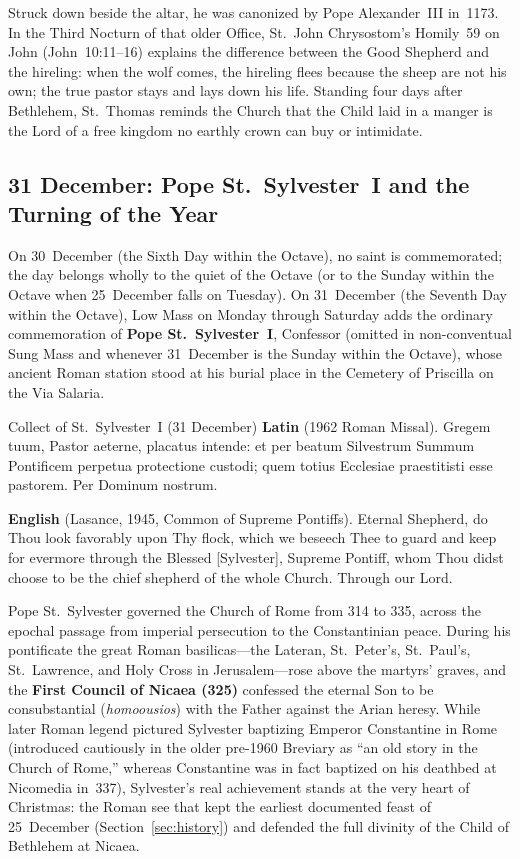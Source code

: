 Struck down beside the altar, he was canonized by Pope Alexander~III in~1173.
In the Third Nocturn of that older Office, St.~John Chrysostom's Homily~59 on
John (John~10:11--16) explains the difference between the Good Shepherd and the
hireling: when the wolf comes, the hireling flees because the sheep are not his
own; the true pastor stays and lays down his life. Standing four days after
Bethlehem, St.~Thomas reminds the Church that the Child laid in a manger is the
Lord of a free kingdom no earthly crown can buy or intimidate.

\subsection{31 December: Pope St.~Sylvester~I and the Turning of the Year}

On 30~December (the Sixth Day within the Octave), no saint is commemorated;
the day belongs wholly to the quiet of the Octave (or to the Sunday within the
Octave when 25~December falls on Tuesday). On 31~December (the Seventh Day
within the Octave), Low Mass on Monday through Saturday adds the ordinary
commemoration of \textbf{Pope St.~Sylvester~I}, Confessor (omitted in
non-conventual Sung Mass and whenever 31~December is the Sunday within the
Octave), whose ancient Roman station stood at his burial place in the Cemetery
of Priscilla on the Via Salaria.

\begin{massbox}{Collect of St.~Sylvester~I (31 December)}
\textbf{Latin} (1962 Roman Missal). Gregem tuum, Pastor aeterne, placatus
intende: et per beatum Silvestrum Summum Pontificem perpetua protectione
custodi; quem totius Ecclesiae praestitisti esse pastorem. Per Dominum nostrum.

\textbf{English} (Lasance, 1945, Common of Supreme Pontiffs). Eternal Shepherd,
do Thou look favorably upon Thy flock, which we beseech Thee to guard and keep
for evermore through the Blessed [Sylvester], Supreme Pontiff, whom Thou didst
choose to be the chief shepherd of the whole Church. Through our Lord.
\end{massbox}

Pope St.~Sylvester governed the Church of Rome from 314 to 335, across the
epochal passage from imperial persecution to the Constantinian peace. During
his pontificate the great Roman basilicas---the Lateran, St.~Peter's,
St.~Paul's, St.~Lawrence, and Holy Cross in Jerusalem---rose above the martyrs'
graves, and the \textbf{First Council of Nicaea (325)} confessed the eternal
Son to be consubstantial (\textit{homoousios}) with the Father against the
Arian heresy. While later Roman legend pictured Sylvester baptizing Emperor
Constantine in Rome (introduced cautiously in the older pre-1960 Breviary as ``an
old story in the Church of Rome,'' whereas Constantine was in fact baptized on
his deathbed at Nicomedia in~337), Sylvester's real achievement stands at the
very heart of Christmas: the Roman see that kept the earliest documented feast
of 25~December (Section~\ref{sec:history}) and defended the full divinity of
the Child of Bethlehem at Nicaea.

